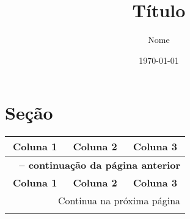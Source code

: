 \documentclass{article}
\title{Título}
\author{Nome}
\date{\today}
\begin{document}
\maketitle

\section{Seção}

\lipsum[1]

\begin{center}
\begin{longtable}{|l|l|l|}

\hline
\multicolumn{1}{|c|}{\textbf{Coluna 1}} & \multicolumn{1}{c|}{\textbf{Coluna 2}} & \multicolumn{1}{c|}{\textbf{Coluna 3}} \\
\hline
\endfirsthead

\multicolumn{3}{c}{{\bfseries \tablename\ \thetable{} -- continuação da página anterior}} \\
\hline
\multicolumn{1}{|c|}{\textbf{Coluna 1}} & \multicolumn{1}{c|}{\textbf{Coluna 2}} & \multicolumn{1}{c|}{\textbf{Coluna 3}} \\
\hline
\endhead

\hline
\multicolumn{3}{|r|}{{Continua na próxima página}} \\
\hline
\endfoot

\hline
\hline
\endlastfoot


\end{longtable}
\end{center}
\end{document}
